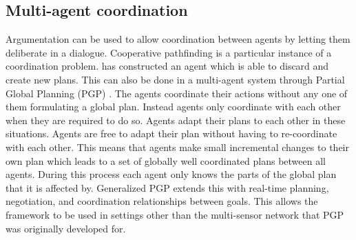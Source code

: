 \subsection{Multi-agent coordination}
Argumentation can be used to allow coordination between agents by letting them
deliberate in a dialogue. Cooperative pathfinding is a particular instance of a
coordination problem. \cite{pollock1995} has constructed an agent which is able 
to discard and create new plans. This can also be done in a multi-agent system 
through Partial Global Planning (PGP) 
\citep[pp.~202--204]{durfee1991,decker1992,woodridge2009}. The agents 
coordinate their actions without any one of them formulating a global plan. 
Instead agents only coordinate with each other when they are required to do so. 
Agents adapt their plans to each other in these situations. Agents are free to 
adapt their plan without having to re-coordinate with each other. This means 
that agents make small incremental changes to their own plan which leads to a 
set of globally well coordinated plans between all agents. During this process 
each agent only knows the parts of the global plan that it is affected by. 
Generalized PGP \citep{decker1992} extends this with real-time planning, 
negotiation, and coordination relationships between goals. This allows the 
framework to be used in settings other than the multi-sensor network that PGP 
was originally developed for.